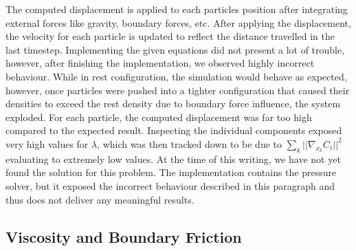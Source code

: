 \documentclass{ACGSeminar}
\begin{document}
The computed displacement is applied to each particles position after integrating external forces like gravity, boundary forces, etc.
After applying the displacement, the velocity for each particle is updated to reflect the distance travelled in the last timestep.
Implementing the given equations did not present a lot of trouble, however, after finishing the implementation, we observed highly incorrect behaviour. While in rest configuration, the simulation would behave as expected, however, once particles were pushed into a tighter configuration that caused their densities to exceed the rest density due to boundary force influence, the system exploded. For each particle, the computed displacement was far too high compared to the expected result.
Inspecting the individual components exposed very high values for \(\lambda\), which was then tracked down to be due to \(\sum_{k}||\nabla_{x_{k}}C_{i}||^2\) evaluating to extremely low values. At the time of this writing, we have not yet found the solution for this problem. The implementation contains the pressure solver, but it exposed the incorrect behaviour described in this paragraph and thus does not deliver any meaningful results.\\

\subsection{Viscosity and Boundary Friction}
\end{document}
